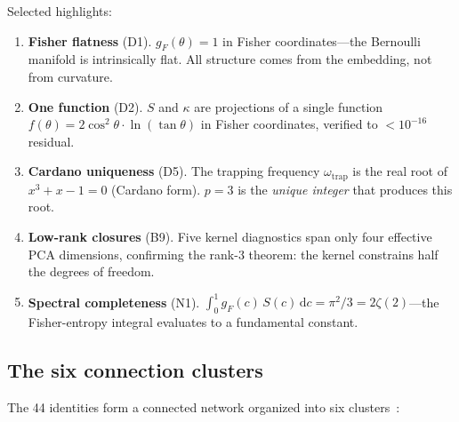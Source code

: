 \documentclass[
  aps,
  prd,
  twocolumn,
  superscriptaddress,
  nofootinbib,
  floatfix
]{revtex4-2}
\newcommand{\dd}{\mathrm{d}}
\newcommand{\gF}{g_{\!F}}
\begin{document}
\noindent Selected highlights:

\begin{enumerate}[leftmargin=*,label=(\alph*)]
\item \textbf{Fisher flatness} (D1).  $\gF(\theta) = 1$ in
  Fisher coordinates---the Bernoulli manifold is intrinsically flat.
  All structure comes from the embedding, not from curvature.

\item \textbf{One function} (D2).  $S$ and $\kappa$ are projections
  of a single function $f(\theta) = 2\cos^2\!\theta \cdot
  \ln(\tan\theta)$ in Fisher coordinates, verified to
  $< 10^{-16}$ residual.

\item \textbf{Cardano uniqueness} (D5).  The trapping frequency
  $\omega_{\mathrm{trap}}$ is the real root of
  $x^3 + x - 1 = 0$ (Cardano form).  $p = 3$ is the
  \emph{unique integer} that produces this root.

\item \textbf{Low-rank closures} (B9).  Five kernel diagnostics
  span only four effective PCA dimensions, confirming the rank-3
  theorem: the kernel constrains half the degrees of freedom.

\item \textbf{Spectral completeness} (N1).  $\int_0^1 \gF(c)\,S(c)\,
  \dd c = \pi^2/3 = 2\zeta(2)$---the Fisher-entropy integral
  evaluates to a fundamental constant.
\end{enumerate}

\subsection{The six connection clusters}

The 44 identities form a connected network organized into six
clusters~\cite{umcpmetadatarepo}:
\end{document}
